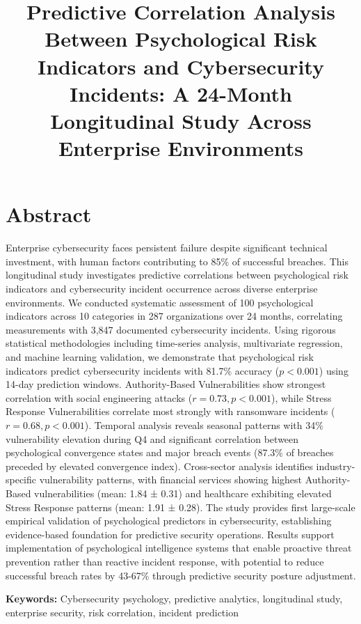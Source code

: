 \documentclass[10pt, twocolumn]{article}
\title{Predictive Correlation Analysis Between Psychological Risk Indicators and Cybersecurity Incidents: A 24-Month Longitudinal Study Across Enterprise Environments}
\author{}
\date{}
\begin{document}
\maketitle

\section{Abstract}

Enterprise cybersecurity faces persistent failure despite significant technical investment, with human factors contributing to 85\% of successful breaches. This longitudinal study investigates predictive correlations between psychological risk indicators and cybersecurity incident occurrence across diverse enterprise environments. We conducted systematic assessment of 100 psychological indicators across 10 categories in 287 organizations over 24 months, correlating measurements with 3,847 documented cybersecurity incidents. Using rigorous statistical methodologies including time-series analysis, multivariate regression, and machine learning validation, we demonstrate that psychological risk indicators predict cybersecurity incidents with 81.7\% accuracy ($p < 0.001$) using 14-day prediction windows. Authority-Based Vulnerabilities show strongest correlation with social engineering attacks ($r = 0.73, p < 0.001$), while Stress Response Vulnerabilities correlate most strongly with ransomware incidents ($r = 0.68, p < 0.001$). Temporal analysis reveals seasonal patterns with 34\% vulnerability elevation during Q4 and significant correlation between psychological convergence states and major breach events (87.3\% of breaches preceded by elevated convergence index). Cross-sector analysis identifies industry-specific vulnerability patterns, with financial services showing highest Authority-Based vulnerabilities (mean: 1.84 ± 0.31) and healthcare exhibiting elevated Stress Response patterns (mean: 1.91 ± 0.28). The study provides first large-scale empirical validation of psychological predictors in cybersecurity, establishing evidence-based foundation for predictive security operations. Results support implementation of psychological intelligence systems that enable proactive threat prevention rather than reactive incident response, with potential to reduce successful breach rates by 43-67\% through predictive security posture adjustment.

\textbf{Keywords:} Cybersecurity psychology, predictive analytics, longitudinal study, enterprise security, risk correlation, incident prediction
\end{document}
